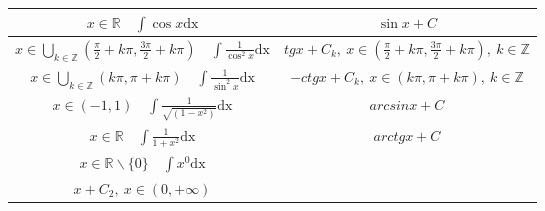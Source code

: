 \documentclass{article}
\begin{document}
\begin{tabular}{ |c|c| }
    $x \in \mathbb{R} \quad \int \cos x \text{dx}$                                                                          & $ \sin x + C$                                                                          \\ \hline
    $x \in \bigcup_{k \in \mathbb{Z}} (\frac{\pi}{2} + k\pi, \frac{3\pi}{2} + k\pi)\quad \int \frac{1}{\cos^2 x} \text{dx}$ & $ tg x + C_k,\ x \in (\frac{\pi}{2} + k\pi, \frac{3\pi}{2} + k\pi),\ k \in \mathbb{Z}$ \\ \hline
    $x \in \bigcup_{k \in \mathbb{Z}} (k\pi, \pi + k\pi)\quad \int \frac{1}{\sin^2 x} \text{dx}$                            & $ -ctg x + C_k,\ x \in (k\pi, \pi + k\pi),\ k \in \mathbb{Z}$                          \\ \hline
    $x \in (-1, 1) \quad \int \frac{1}{\sqrt{(1 - x^2)}} \text{dx}                      $                                   & $ arcsinx + C$                                                                         \\ \hline
    $x \in \mathbb{R} \quad \int \frac{1}{1+x^2} \text{dx}                              $                                   & $ arctg x + C$                                                                         \\ \hline
    $x \in \mathbb{R}\backslash \{0\} \quad \int x^{0} \text{dx}$                                                           &
    \makecell{
    $x + C_1,\ x \in (-\infty, 0)$                                                                                                                                                                                   \\
        $x + C_2,\ x \in (0, +\infty)$
    }                                                                                                                                                                                                                \\ \hline
\end{tabular}
\end{document}
